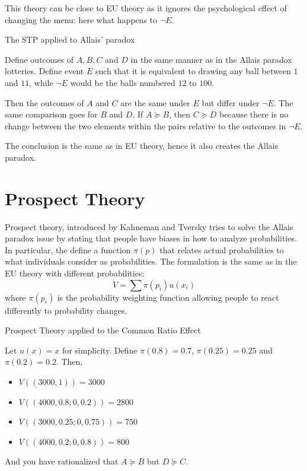 \documentclass[12pt]{report}
\begin{document}
This theory can be close to EU theory as it ignores the psychological effect of changing the menu: here what happens to $\neg E$.

\begin{bclogo}[couleur=blue!10, arrondi=0.1, logo=,ombre=false]{ The STP applied to Allais' paradox} 
\begin{small}
Define outcomes of $A, B, C$ and $D$ in the same manner as in the Allais paradox lotteries. Define event $E$ such that it is equivalent to drawing any ball between $1$ and $11$, while $\neg E$ would be the balls numbered $12$ to $100$.

Then the outcomes of $A$ and $C$ are the same under $E$ but differ under $\neg E$. The same comparison goes for $B$ and $D$. If $A\succeq B$, then $C\succeq D$ because there is no change between the two elements within the pairs relative to the outcomes in $\neg E$.

The conclusion is the same as in EU theory, hence it also creates the Allais paradox.
\end{small}
\end{bclogo}

\section{Prospect Theory}

Prospect theory, introduced by Kahneman and Tversky tries to solve the Allais paradox issue by stating that people have biases in how to analyze probabilities. In particular, the define a function $\pi(p)$ that relates actual probabilities to what individuals consider as probabilities. The formulation is the same as in the EU theory with different probabilities:$$V = \sum\pi(p_i)u(x_i)$$ where $\pi(p_i)$ is the probability weighting function allowing people to react differently to probability changes.

\begin{bclogo}[couleur=blue!10, arrondi=0.1, logo=,ombre=false]{ Prospect Theory applied to the Common Ratio Effect} 
\begin{small}
Let $u(x) = x$ for simplicity. Define $\pi(0.8) = 0.7$, $\pi(0.25) = 0.25$ and $\pi(0.2) = 0.2$. Then,\begin{itemize}
\item $V((3000,1)) = 3000$
\item $V((4000, 0.8;0,0.2)) = 2800$
\item $V((3000, 0.25;0,0.75)) = 750$
\item $V((4000, 0.2; 0, 0.8)) = 800$
\end{itemize}
And you have rationalized that $A\succeq B$ but $D\succeq C$.
\end{small}
\end{bclogo}
\end{document}
